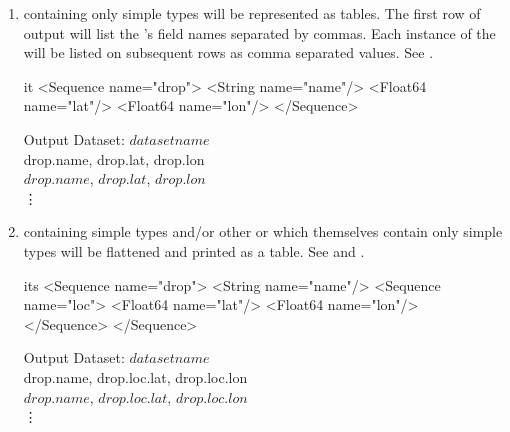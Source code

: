 \documentclass[justify]{dods-paper}
\begin{document}
\begin{enumerate}
\item \Sequences containing only simple types will be represented as tables.
  The first row of output will list the \Sequence's field names separated by
  commas. Each instance of the \Sequence will be listed on subsequent rows as
  comma separated values.  See .

\begin{minipage}[t]{2.5in}

\begin{vcode}{it}
<Sequence name="drop">
  <String name="name"/>
  <Float64 name="lat"/>
  <Float64 name="lon"/>
</Sequence>
\end{vcode}
\end{minipage}
\begin{minipage}[t]{5in}
\begin{textoutput}{Output}
Dataset: $dataset name$\\
drop.name, drop.lat, drop.lon\\
$drop.name$, $drop.lat$, $drop.lon$\\
\vdots
\end{textoutput}
\end{minipage}

\item \Sequences containing simple types and/or other \Sequences or \Structures
  which themselves contain only simple types will be flattened and printed as
  a table.  See  and .

\begin{minipage}[t]{2.5in}

\begin{vcode}{its}
<Sequence name="drop">
  <String name="name"/>
  <Sequence name="loc">
    <Float64 name="lat"/>
    <Float64 name="lon"/>
  </Sequence>
</Sequence>
\end{vcode}
\end{minipage}
\begin{minipage}[t]{5in}
\begin{textoutput}{Output}
Dataset: $dataset name$\\
drop.name, drop.loc.lat, drop.loc.lon\\
$drop.name$, $drop.loc.lat$, $drop.loc.lon$\\
\vdots
\end{textoutput}
\end{minipage}

\begin{minipage}[t]{2.5in}


\end{minipage}
\end{enumerate}
\end{document}
